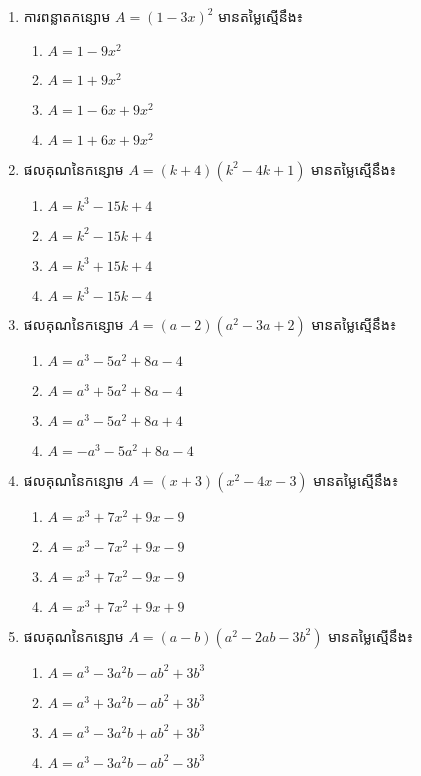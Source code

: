 \begin{enumerate}
\item ការពន្លាតកន្សោម $A=(1-3x)^2$ មានតម្លៃស្មើនឹង៖
\begin{multicols}{2}
\begin{enumerate}[label=\alph*.]
\item $A=1-9x^2$
\item $A=1+9x^2$
\item $A=1-6x+9x^2$
\item $A=1+6x+9x^2$
\end{enumerate}
\end{multicols}

\item ផលគុណនៃកន្សោម $A=(k+4)(k^2-4k+1)$ មានតម្លៃស្មើនឹង៖
\begin{multicols}{2}
\begin{enumerate}[label=\alph*.]
\item $A=k^3-15k+4$
\item $A=k^2-15k+4$
\item $A=k^3+15k+4$
\item $A=k^3-15k-4$
\end{enumerate}
\end{multicols}

\item ផលគុណនៃកន្សោម $A=(a-2)(a^2-3a+2)$ មានតម្លៃស្មើនឹង៖
\begin{multicols}{2}
\begin{enumerate}[label=\alph*.]
\item $A=a^3-5a^2+8a-4$
\item $A=a^3+5a^2+8a-4$
\item $A=a^3-5a^2+8a+4$
\item $A=-a^3-5a^2+8a-4$
\end{enumerate}
\end{multicols}

\item ផលគុណនៃកន្សោម $A=(x+3)(x^2-4x-3)$ មានតម្លៃស្មើនឹង៖
\begin{multicols}{2}
\begin{enumerate}[label=\alph*.]
\item $A=x^3+7x^2+9x-9$
\item $A=x^3-7x^2+9x-9$
\item $A=x^3+7x^2-9x-9$
\item $A=x^3+7x^2+9x+9$
\end{enumerate}
\end{multicols}

\item ផលគុណនៃកន្សោម $A=(a-b)(a^2-2ab-3b^2)$ មានតម្លៃស្មើនឹង៖
\begin{multicols}{2}
\begin{enumerate}[label=\alph*.]
\item $A=a^3-3a^2b-ab^2+3b^3$
\item $A=a^3+3a^2b-ab^2+3b^3$
\item $A=a^3-3a^2b+ab^2+3b^3$
\item $A=a^3-3a^2b-ab^2-3b^3$
\end{enumerate}
\end{multicols}


\end{enumerate}
